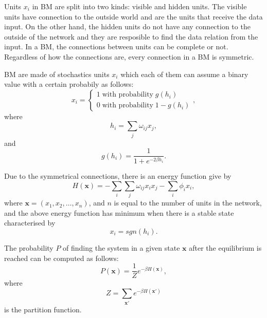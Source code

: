 Units $x_{i}$ in BM are split into two kinds: visible and hidden units. 
The visible units have connection to the outside world and are the units that receive the data input. 
On the other hand, the hidden units do not have any connection to the outside of the network and they are resposible to find the data relation from the input. 
In a BM, the connections between units can be complete or not. 
Regardless of how the connections are, every connection in a BM is symmetric.

BM are made of stochastics units $x_{i}$ which each of them can assume a binary value with a certain probabily as follows:
\begin{equation}
  x_{i} =
    \begin{cases}
      1 \; \text{with probability} \; g(h_{i}) \\
      0 \; \text{with probability} \; 1 - g(h_{i})
    \end{cases},
  \label{eq:eq1}
\end{equation}
where
\begin{equation}
  h_{i} = \sum_{j}\omega_{ij}x_{j},
  \label{eq:eq2}
\end{equation}
and
\begin{equation}
  g(h_{i}) = \frac{1}{1 + e^{-2 \beta h_{i}}}.
  \label{eq:eq3}
\end{equation}

Due to the symmetrical connections, there is an energy function give by
\begin{equation}
  H(\mathbf{x}) = - \sum_{i} \sum_{j} \omega_{ij}x_{i}x_{j} - \sum_{i} \phi_{i}x_{i},
  \label{eq:eq4}
\end{equation}
where $\mathbf{x} = (x_{1}, x_{2}, \dots, x_{n})$, and $n$ is equal to the number of units in the network, and the above energy function has minimum when there is a stable state characterised by
\begin{equation}
  x_{i} = sgn(h_{i}).
  \label{eq:eq5}
\end{equation}

The probability $P$ of finding the system in a given state $\mathbf{x}$ after the equilibrium is reached can be computed as follows:
\begin{equation}
  P(\mathbf{x}) = \frac{1}{Z} e^{-\beta H(\mathbf{x})},
  \label{eq:eq6}
\end{equation}
where
\begin{equation}
  Z = \sum_{\mathbf{x}'} e^{-\beta H(\mathbf{x}')}
  \label{eq:eq7}
\end{equation}
is the partition function.

